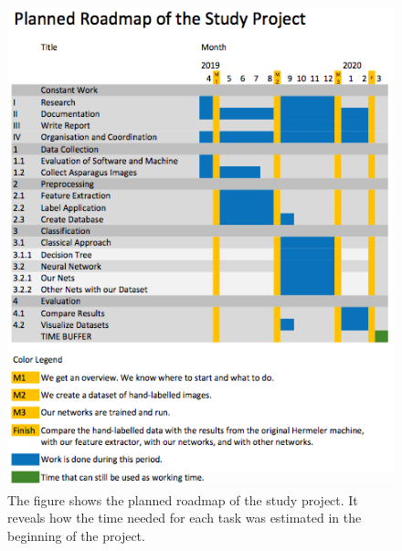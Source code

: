 \begin{figure}[h]
	\centering
	\includegraphics[scale=0.5]{Figures/chapter02/roadmap_planned}
	\decoRule
	\caption[Planned Roadmap]{The figure shows the planned roadmap of the study project. It reveals how the time needed for each task was estimated in the beginning of the project.}
	\label{fig:RoadmapPlanned}
\end{figure}

